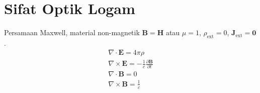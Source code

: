 \chapter{Sifat Optik Logam}

Persamaan Maxwell, material non-magnetik $\mathbf{B} = \mathbf{H}$ atau $\mu = 1$,
$\rho_{\mathrm{ext}} = 0$, $\mathbf{J}_{\mathrm{ext}} = \mathbf{0}$.
\begin{align}
\nabla \cdot \mathbf{E} = 4\pi\rho \\
\nabla \times \mathbf{E} = -\frac{1}{c}\frac{\partial \mathbf{B}}{\partial t} \\
\nabla \cdot \mathbf{B} = 0 \\
\nabla \times \mathbf{B} = \frac{1}{c}
\end{align}